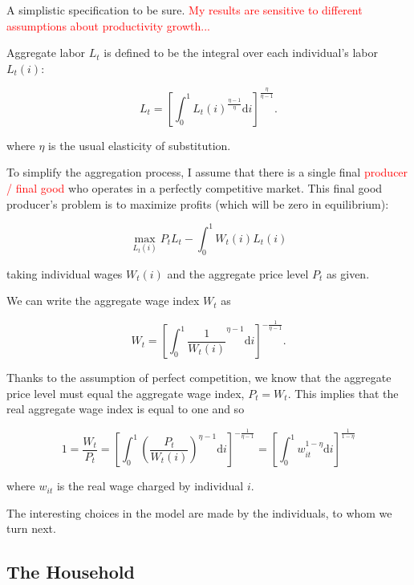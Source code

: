 \documentclass[12pt,a4paper]{scrartcl}            %
\begin{document}
A simplistic specification to be sure.  \textcolor{red}{My results are sensitive to different assumptions about productivity growth...}

Aggregate labor \(L_t\) is defined to be the integral over each individual's labor \(L_t(i)\):

\begin{equation} \label{eq:agg_labor}
    L_t = \left[ \int_0^1 L_t(i)^{\frac{\eta - 1}{\eta}} \mathrm{d}i \right]^{\frac{\eta}{\eta - 1}}.
\end{equation}

where $\eta$ is the usual elasticity of substitution.

To simplify the aggregation process, I assume that there is a single final \textcolor{red}{producer / final good} who operates in a perfectly competitive market.
This final good producer's problem is to maximize profits (which will be zero in equilibrium):

\begin{equation} \label{eq:firms_problem}
    \max_{L_t(i)} P_t L_t - \int_0^1 W_t(i)L_t(i)
\end{equation}

taking individual wages $W_t(i)$ and the aggregate price level $P_t$ as given.

We can write the aggregate wage index $W_t$ as

\begin{equation} \label{eq:wage_index}
    W_t = \left[\int_{0}^{1}\frac{1}{W_t(i)}^{\eta - 1} \mathrm{d}i \right]^{-\frac{1}{\eta - 1}}.
\end{equation}

Thanks to the assumption of perfect competition, we know that the aggregate price level must equal the aggregate wage index, $P_t = W_t$.  This implies that the real aggregate wage index is equal to one and so

\begin{equation} \label{eq:real_wage}
    1 = \frac{W_t}{P_t} = \left[\int_{0}^{1} \left( \frac{P_t}{W_t(i)} \right)^{\eta - 1} \mathrm{d}i \right]^{-\frac{1}{\eta - 1} } = \left[\int_{0}^{1} \! w_{it}^{1 - \eta} \mathrm{d}i \right]^{ \frac{1}{1 - \eta} }
\end{equation}

where $w_{it}$ is the real wage charged by individual $i$.

The interesting choices in the model are made by the individuals, to whom we turn next.

\subsection{The Household}
\label{sub:The Household}
\end{document}
